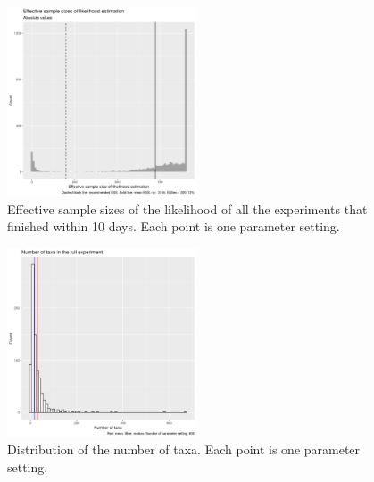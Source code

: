 \begin{figure}[!htbp]
  \includegraphics[width=0.5\textwidth]{20200204_fig_esses.png}
  \caption{
    Effective sample sizes of the likelihood of all the experiments that
    finished within 10 days. 
    Each point is one parameter setting.
  }
  \label{fig:esses}
\end{figure}

\begin{figure}[!htbp]
  \includegraphics[width=0.5\textwidth]{20200204_fig_n_taxa.png}
  \caption{
    Distribution of the number of taxa.
    Each point is one parameter setting.
  }
  \label{fig:n_taxa}
\end{figure}

